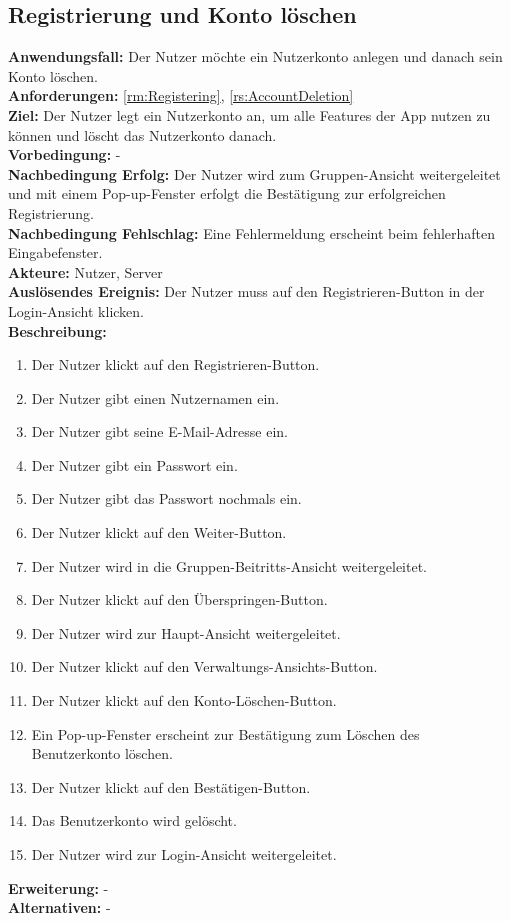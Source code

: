 \documentclass[parskip=full]{scrartcl}
\begin{document}
\subsection{Registrierung und Konto löschen}
\textbf{Anwendungsfall:} Der Nutzer möchte ein Nutzerkonto anlegen und danach sein Konto löschen.\\
\textbf{Anforderungen:} \ref{rm:Registering}, \ref{rs:AccountDeletion} \\
\textbf{Ziel:} Der Nutzer legt ein Nutzerkonto an, um alle Features der App nutzen zu können und löscht das Nutzerkonto danach.\\
\textbf{Vorbedingung:} -\\
\textbf{Nachbedingung Erfolg:} Der Nutzer wird zum Gruppen-Ansicht weitergeleitet und mit einem Pop-up-Fenster erfolgt die Bestätigung zur erfolgreichen Registrierung.\\
\textbf{Nachbedingung Fehlschlag:} Eine Fehlermeldung erscheint beim fehlerhaften Eingabefenster.\\
\textbf{Akteure:} Nutzer, Server\\
\textbf{Auslösendes Ereignis:} Der Nutzer muss auf den Registrieren-Button in der Login-Ansicht klicken.\\
\textbf{Beschreibung:}
\begin{enumerate}
    \item Der Nutzer klickt auf den Registrieren-Button.
    \item Der Nutzer gibt einen Nutzernamen ein.
    \item Der Nutzer gibt seine E-Mail-Adresse ein.
    \item Der Nutzer gibt ein Passwort ein.
    \item Der Nutzer gibt das Passwort nochmals ein.
    \item Der Nutzer klickt auf den Weiter-Button.
    \item Der Nutzer wird in die Gruppen-Beitritts-Ansicht weitergeleitet.
    \item Der Nutzer klickt auf den Überspringen-Button.
    \item Der Nutzer wird zur Haupt-Ansicht weitergeleitet.
    \item Der Nutzer klickt auf den Verwaltungs-Ansichts-Button.
    \item Der Nutzer klickt auf den Konto-Löschen-Button.
    \item Ein Pop-up-Fenster erscheint zur Bestätigung zum Löschen des Benutzerkonto löschen.
    \item Der Nutzer klickt auf den Bestätigen-Button.
    \item Das Benutzerkonto wird gelöscht.
    \item Der Nutzer wird zur Login-Ansicht weitergeleitet.
\end{enumerate}
\textbf{Erweiterung:} -\\
\textbf{Alternativen:} -
\newpage
\end{document}
